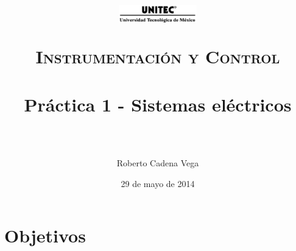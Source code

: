 



\title{	
	\normalfont \normalsize
	\begin{figure}[h]
		\begin{center}
			\includegraphics[width=0.3\textwidth]{../images/UNITEC.png}
		\end{center}
	\end{figure}
	\textsc{Instrumentación y Control} \\ [25pt]
	\horrule{0.5pt} \\[0.4cm] %
	\huge Práctica 1 - Sistemas eléctricos \\ %
	\horrule{2pt} \\[0.5cm] %
}

\author{Roberto Cadena Vega} %

\date{\normalsize 29 de mayo de 2014} %




\maketitle %


\section{Objetivos}

